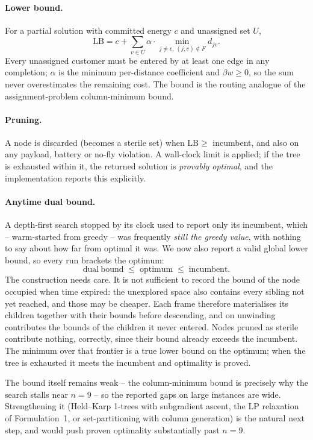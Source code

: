 \documentclass[11pt,a4paper]{article}
\begin{document}
\paragraph{Lower bound.} For a partial solution with committed energy $c$ and
unassigned set $U$,
\[
  \mathrm{LB} = c + \sum_{v \in U} \alpha \cdot \min_{j \ne v,\,(j,v)\notin F} d_{jv}.
\]
Every unassigned customer must be entered by at least one edge in any completion;
$\alpha$ is the minimum per-distance coefficient and $\beta w \ge 0$, so the sum
never overestimates the remaining cost. The bound is the routing analogue of the
assignment-problem column-minimum bound.

\paragraph{Pruning.} A node is discarded (becomes a sterile set) when
$\mathrm{LB} \ge$ incumbent, and also on any payload, battery or no-fly violation.
A wall-clock limit is applied; if the tree is exhausted within it, the returned
solution is \emph{provably optimal}, and the implementation reports this
explicitly.

\paragraph{Anytime dual bound.}
A depth-first search stopped by its clock used to report only its incumbent,
which -- warm-started from greedy -- was frequently \emph{still the greedy
value}, with nothing to say about how far from optimal it was. We now also
report a valid global lower bound, so every run brackets the optimum:
\[
  \mathrm{dual\ bound} \;\le\; \mathrm{optimum} \;\le\; \mathrm{incumbent}.
\]
The construction needs care. It is not sufficient to record the bound of the node
occupied when time expired: the unexplored space also contains every sibling not
yet reached, and those may be cheaper. Each frame therefore materialises its
children together with their bounds before descending, and on unwinding
contributes the bounds of the children it never entered. Nodes pruned as sterile
contribute nothing, correctly, since their bound already exceeds the incumbent.
The minimum over that frontier is a true lower bound on the optimum; when the
tree is exhausted it meets the incumbent and optimality is proved.

The bound itself remains weak -- the column-minimum bound is precisely why the
search stalls near $n=9$ -- so the reported gaps on large instances are wide.
Strengthening it (Held--Karp 1-trees with subgradient ascent, the LP relaxation
of Formulation~1, or set-partitioning with column generation) is the natural next
step, and would push proven optimality substantially past $n=9$.
\end{document}
